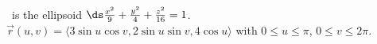 {\surfaceS\ is the ellipsoid $\ds\frac{x^2}{9} + \frac{y^2}{4}+\frac{z^2}{16} = 1$.
}
{$\vec r(u,v) = \langle 3\sin u\cos v, 2\sin u\sin v, 4\cos u\rangle$ with $0\leq u\leq \pi$, $0\leq v\leq 2\pi$.
}
